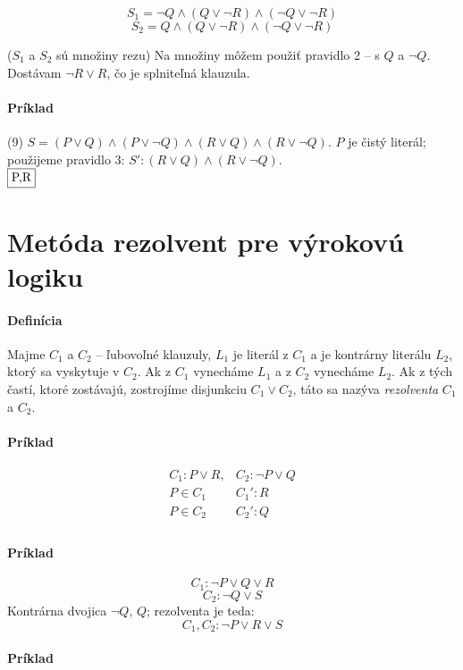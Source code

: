 \par
$$S_1 = \neg Q \land (Q \lor \neg R) \land (\neg Q \lor \neg R)$$
$$S_2 = Q \land (Q \lor \neg R) \land (\neg Q \lor \neg R)$$

($S_1$ a $S_2$ sú množiny rezu)
Na množiny môžem použiť pravidlo 2 -- s $Q$ a $\neg Q$. Dostávam $\neg R \lor
R$, čo je splniteľná klauzula.

\paragraph{Príklad} (9) $S=(P \lor Q) \land (P \lor \neg Q) \land (R \lor Q)
\land (R \lor \neg Q)$. $P$ je čistý literál; použijeme pravidlo 3:
$S': (R \lor Q) \land (R \lor \neg Q)$. \\
$\fbox{P,R}$ \\

\section{Metóda rezolvent pre výrokovú logiku}

\paragraph{Definícia} Majme $C_1$ a $C_2$ -- ľubovoľné klauzuly, $L_1$ je
literál z $C_1$ a je kontrárny literálu $L_2$, ktorý sa vyskytuje v $C_2$. Ak z
$C_1$ vynecháme $L_1$ a z $C_2$ vynecháme $L_2$. Ak z tých častí, ktoré
zostávajú, zostrojíme disjunkciu $C_1 \lor C_2$, táto sa nazýva
\emph{rezolventa} $C_1$ a $C_2$.

\paragraph{Príklad}
$$
\begin{array}{ll}
C_1: P \lor R, & C_2: \neg P \lor Q \\
P \in C_1 & C_1': R \\
P \in C_2 & C_2': Q \\
\end{array}
$$

\paragraph{Príklad}
$$C_1: \neg P \lor Q\lor R$$
$$C_2: \neg Q \lor S$$
Kontrárna dvojica $\neg Q$, $Q$; rezolventa je teda:
$$C_1, C_2: \neg P \lor R \lor S$$

\paragraph{Príklad}

